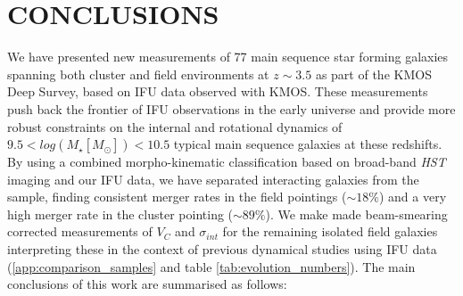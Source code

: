 \documentclass[fleqn,usenatbib]{mn2e}
\begin{document}
\section{CONCLUSIONS}\label{sec:conclusion}
We have presented new measurements of 77 main sequence star forming galaxies spanning both cluster and field environments at $z\sim3.5$ as part of the KMOS Deep Survey, based on IFU data observed with KMOS.
These measurements push back the frontier of IFU observations in the early universe and provide more robust constraints on the internal and rotational dynamics of $9.5 < log(M_{\star}[M_{\odot}])< 10.5$ typical main sequence galaxies at these redshifts.
By using a combined morpho-kinematic classification based on broad-band {\em HST} imaging and our IFU data, we have separated interacting galaxies from the sample, finding consistent merger rates in the field pointings ($\sim18\%$) and a very high merger rate in the cluster pointing ($\sim89\%$).
We make made beam-smearing corrected measurements of $V_{C}$ and $\sigma_{int}$ for the remaining isolated field galaxies interpreting these in the context of previous dynamical studies using IFU data (\cref{app:comparison_samples} and table \ref{tab:evolution_numbers}).
The main conclusions of this work are summarised as follows:
\end{document}

